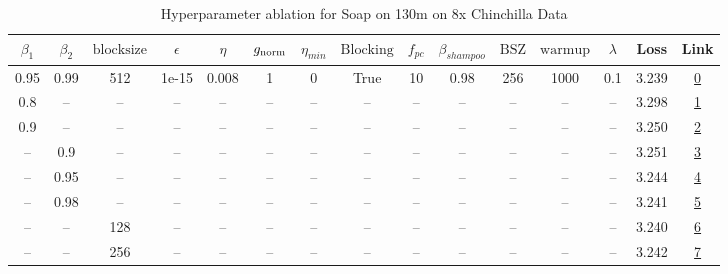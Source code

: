 \begin{table}[H]
\centering
\caption{Hyperparameter ablation for Soap on 130m on 8x Chinchilla Data}
\label{tab:ablation_soap_130m_on_8x_chinchilla_data}
\begin{tabular}{ccccccccccccccc}
\toprule
$\beta_1$ & $\beta_2$ & $\mathrm{block size}$ & $\epsilon$ & $\eta$ & $g_{\mathrm{norm}}$ & $\eta_{min}$ & $\mathrm{Blocking}$ & $f_{pc}$ & $\beta_{shampoo}$ & $\mathrm{BSZ}$ & $\mathrm{warmup}$ & $\lambda$ & Loss & Link \\
\midrule
0.95 & 0.99 & 512 & 1e-15 & 0.008 & 1 & 0 & True & 10 & 0.98 & 256 & 1000 & 0.1 & 3.239 & \href{https://wandb.ai/marin-community/optimizer-scaling/runs/sweep-130m-21B-soape2479ablr0.008-wd0.1-minlr0-warmup1000-b10.95-a17efa}{0} \\
\midrule
0.8 & -- & -- & -- & -- & -- & -- & -- & -- & -- & -- & -- & -- & 3.298 & \href{https://wandb.ai/marin-community/optimizer-scaling/runs/sweep-130m-21B-soape2d8ee9lr0.008-wd0.1-minlr0-warmup1000-b10.8--cbb0fb}{1} \\
0.9 & -- & -- & -- & -- & -- & -- & -- & -- & -- & -- & -- & -- & 3.250 & \href{https://wandb.ai/marin-community/optimizer-scaling/runs/sweep-130m-21B-soape5dcf61lr0.008-wd0.1-minlr0-warmup1000-b10.9--69f18f}{2} \\
-- & 0.9 & -- & -- & -- & -- & -- & -- & -- & -- & -- & -- & -- & 3.251 & \href{https://wandb.ai/marin-community/optimizer-scaling/runs/sweep-130m-21B-soape812156lr0.008-wd0.1-minlr0-warmup1000-b10.95-a40bb0}{3} \\
-- & 0.95 & -- & -- & -- & -- & -- & -- & -- & -- & -- & -- & -- & 3.244 & \href{https://wandb.ai/marin-community/optimizer-scaling/runs/sweep-130m-21B-soape28447clr0.008-wd0.1-minlr0-warmup1000-b10.95-fe0c4b}{4} \\
-- & 0.98 & -- & -- & -- & -- & -- & -- & -- & -- & -- & -- & -- & 3.241 & \href{https://wandb.ai/marin-community/optimizer-scaling/runs/sweep-130m-21B-soape111b71lr0.008-wd0.1-minlr0-warmup1000-b10.95-80abaa}{5} \\
-- & -- & 128 & -- & -- & -- & -- & -- & -- & -- & -- & -- & -- & 3.240 & \href{https://wandb.ai/marin-community/optimizer-scaling/runs/sweep-130m-21B-soapebbce2flr0.008-wd0.1-minlr0-warmup1000-b10.95-d9c8f1}{6} \\
-- & -- & 256 & -- & -- & -- & -- & -- & -- & -- & -- & -- & -- & 3.242 & \href{https://wandb.ai/marin-community/optimizer-scaling/runs/sweep-130m-21B-soape0e8fddlr0.008-wd0.1-minlr0-warmup1000-b10.95-b0e218}{7} \\

\end{tabular}
\end{table}
